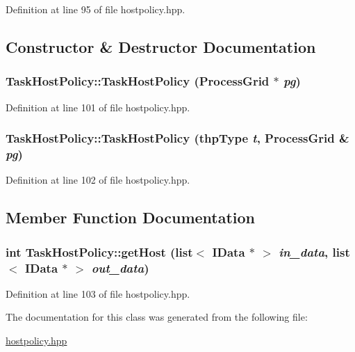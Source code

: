 Definition at line 95 of file hostpolicy.hpp.

\subsection{Constructor \& Destructor Documentation}
\hypertarget{class_task_host_policy_af9c550ad2f9c9a9bdcd8af4165954e58}{
\subsubsection[{TaskHostPolicy}]{\setlength{\rightskip}{0pt plus 5cm}TaskHostPolicy::TaskHostPolicy ({\bf ProcessGrid} $\ast$ {\em pg})}}
\label{class_task_host_policy_af9c550ad2f9c9a9bdcd8af4165954e58}


Definition at line 101 of file hostpolicy.hpp.\hypertarget{class_task_host_policy_a4204418e800499b0f5a2e4daf4672b91}{
\subsubsection[{TaskHostPolicy}]{\setlength{\rightskip}{0pt plus 5cm}TaskHostPolicy::TaskHostPolicy ({\bf thpType} {\em t}, \/  {\bf ProcessGrid} \& {\em pg})}}
\label{class_task_host_policy_a4204418e800499b0f5a2e4daf4672b91}


Definition at line 102 of file hostpolicy.hpp.

\subsection{Member Function Documentation}
\hypertarget{class_task_host_policy_a1da54714fedb9ee51d454f39bfe32a4f}{
\subsubsection[{getHost}]{\setlength{\rightskip}{0pt plus 5cm}int TaskHostPolicy::getHost (list$<$ {\bf IData} $\ast$ $>$ {\em in\_\-data}, \/  list$<$ {\bf IData} $\ast$ $>$ {\em out\_\-data})}}
\label{class_task_host_policy_a1da54714fedb9ee51d454f39bfe32a4f}


Definition at line 103 of file hostpolicy.hpp.

The documentation for this class was generated from the following file:\begin{DoxyCompactItemize}
\item 
\hyperlink{hostpolicy_8hpp}{hostpolicy.hpp}\end{DoxyCompactItemize}
